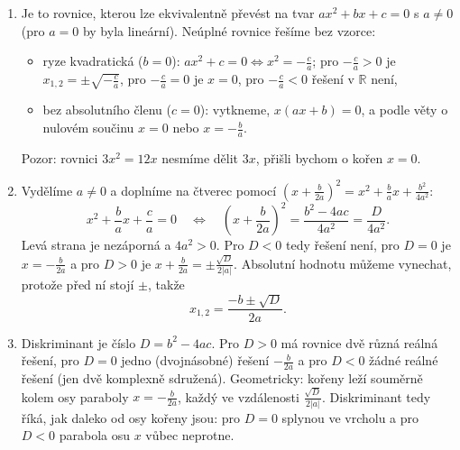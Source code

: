 \begin{enumerate}[label=\textbf{\arabic*.}, leftmargin=*, itemsep=0.8em]
  \item {}
  Je to rovnice, kterou lze ekvivalentně převést na tvar $ax^2 + bx + c = 0$ s $a\neq 0$ (pro $a = 0$ by byla lineární). Neúplné rovnice řešíme bez vzorce:
  \begin{itemize}
    \item ryze kvadratická ($b = 0$): $ax^2 + c = 0 \Leftrightarrow x^2 = -\frac{c}{a}$; pro $-\frac{c}{a} > 0$ je $x_{1,2} = \pm\sqrt{-\frac{c}{a}}$, pro $-\frac{c}{a} = 0$ je $x = 0$, pro $-\frac{c}{a} < 0$ řešení v $\mathbb{R}$ není,
    \item bez absolutního členu ($c = 0$): vytkneme, $x(ax + b) = 0$, a podle věty o nulovém součinu $x = 0$ nebo $x = -\frac{b}{a}$.
  \end{itemize}
  Pozor: rovnici $3x^2 = 12x$ nesmíme dělit $3x$, přišli bychom o kořen $x = 0$. 

  \item {}
  Vydělíme $a\neq 0$ a doplníme na čtverec pomocí ${\left(x + \frac{b}{2a}\right)}^2 = x^2 + \frac{b}{a}x + \frac{b^2}{4a^2}$:
  \begin{equation*}
    x^2 + \frac{b}{a}x + \frac{c}{a} = 0 \quad\Leftrightarrow\quad {\left(x + \frac{b}{2a}\right)}^2 = \frac{b^2 - 4ac}{4a^2} = \frac{D}{4a^2}.
  \end{equation*}
  Levá strana je nezáporná a $4a^2 > 0$. Pro $D < 0$ tedy řešení není, pro $D = 0$ je $x = -\frac{b}{2a}$ a pro $D > 0$ je $x + \frac{b}{2a} = \pm\frac{\sqrt{D}}{2|a|}$. Absolutní hodnotu můžeme vynechat, protože před ní stojí $\pm$, takže
  \begin{equation*}
    x_{1,2} = \frac{-b\pm\sqrt{D}}{2a}.
  \end{equation*}

  \item {}
  Diskriminant je číslo $D = b^2 - 4ac$. Pro $D > 0$ má rovnice dvě různá reálná řešení, pro $D = 0$ jedno (dvojnásobné) řešení $-\frac{b}{2a}$ a pro $D < 0$ žádné reálné řešení (jen dvě komplexně sdružená). Geometricky: kořeny leží souměrně kolem osy paraboly $x = -\frac{b}{2a}$, každý ve vzdálenosti $\frac{\sqrt{D}}{2|a|}$. Diskriminant tedy říká, jak daleko od osy kořeny jsou: pro $D = 0$ splynou ve vrcholu a pro $D < 0$ parabola osu $x$ vůbec neprotne.


\end{enumerate}
